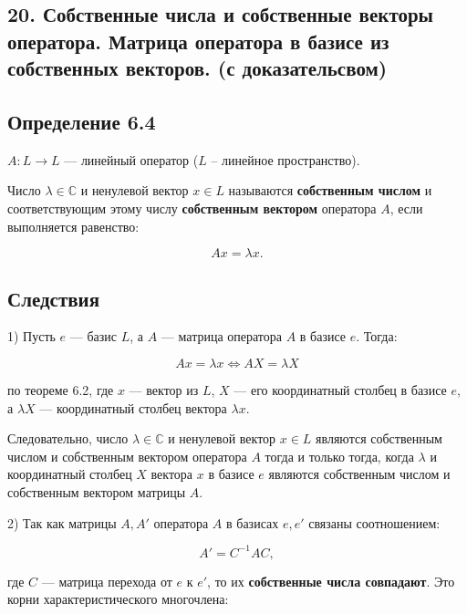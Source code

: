{
\subsection{20.	Собственные числа и собственные векторы оператора. Матрица оператора в базисе из собственных векторов. (с доказательсвом)
}
\subsection*{Определение 6.4}

\( A : L \to L \) — линейный оператор (\( L \) – линейное пространство).

Число \( \lambda \in \mathbb{C} \) и ненулевой вектор \( x \in L \) называются \textbf{собственным числом} и соответствующим этому числу \textbf{собственным вектором} оператора \( A \), если выполняется равенство:



\[
A x = \lambda x.
\]



\subsection*{Следствия}

1) Пусть \( e \) — базис \( L \), а \( A \) — матрица оператора \( A \) в базисе \( e \). Тогда:



\[
A x = \lambda x \iff A X = \lambda X
\]



по теореме 6.2, где \( x \) — вектор из \( L \), \( X \) — его координатный столбец в базисе \( e \), а \( \lambda X \) — координатный столбец вектора \( \lambda x \).

Следовательно, число \( \lambda \in \mathbb{C} \) и ненулевой вектор \( x \in L \) являются собственным числом и собственным вектором оператора \( A \) тогда и только тогда, когда \( \lambda \) и координатный столбец \( X \) вектора \( x \) в базисе \( e \) являются собственным числом и собственным вектором матрицы \( A \).

2) Так как матрицы \( A, A' \) оператора \( A \) в базисах \( e, e' \) связаны соотношением:



\[
A' = C^{-1} A C,
\]



где \( C \) — матрица перехода от \( e \) к \( e' \), то их \textbf{собственные числа совпадают}. Это корни характеристического многочлена:



}
